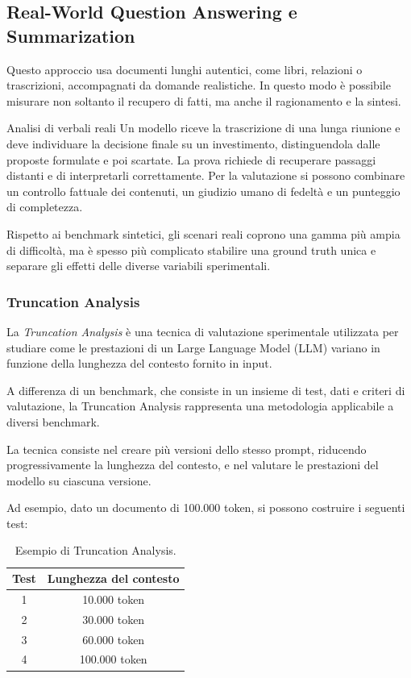 \subsection{Real-World Question Answering e Summarization}

Questo approccio usa documenti lunghi autentici, come libri, relazioni o trascrizioni, accompagnati da domande realistiche. In questo modo è possibile misurare non soltanto il recupero di fatti, ma anche il ragionamento e la sintesi.

\begin{example}{Analisi di verbali reali}
Un modello riceve la trascrizione di una lunga riunione e deve individuare la decisione finale su un investimento, distinguendola dalle proposte formulate e poi scartate. La prova richiede di recuperare passaggi distanti e di interpretarli correttamente. Per la valutazione si possono combinare un controllo fattuale dei contenuti, un giudizio umano di fedeltà e un punteggio di completezza.
\end{example}

Rispetto ai benchmark sintetici, gli scenari reali coprono una gamma più ampia di difficoltà, ma è spesso più complicato stabilire una ground truth unica e separare gli effetti delle diverse variabili sperimentali.


\subsubsection{Truncation Analysis}

La \textit{Truncation Analysis} è una tecnica di
valutazione sperimentale utilizzata per studiare
come le prestazioni di un Large Language Model (LLM)
variano in funzione della lunghezza del contesto
fornito in input.

A differenza di un benchmark, che consiste in un
insieme di test, dati e criteri di valutazione,
la Truncation Analysis rappresenta una metodologia
applicabile a diversi benchmark.

La tecnica consiste nel creare più versioni dello
stesso prompt, riducendo progressivamente la
lunghezza del contesto, e nel valutare le
prestazioni del modello su ciascuna versione.

Ad esempio, dato un documento di 100.000 token,
si possono costruire i seguenti test:

\begin{table}[ht]
    \centering
    \begin{tabular}{|c|c|}
        \hline
        \textbf{Test} &
        \textbf{Lunghezza del contesto} \\
        \hline
        1 & 10.000 token \\
        \hline
        2 & 30.000 token \\
        \hline
        3 & 60.000 token \\
        \hline
        4 & 100.000 token \\
        \hline
    \end{tabular}
    \caption{Esempio di Truncation Analysis.}
    \label{tab:truncation_analysis}
\end{table}

